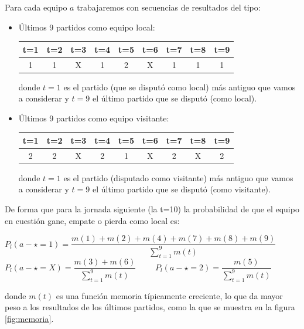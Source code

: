 Para cada equipo $a$ trabajaremos con secuencias de resultados del tipo:
\begin{itemize}
\item Últimos 9 partidos como equipo local:
\begin{center}
	\begin{tabular}{|c|c|c|c|c|c|c|c|c|}
		\hline  t=1 & t=2 & t=3 & t=4 & t=5 & t=6 & t=7 & t=8 & t=9 \\ 
		\hline  1 & 1 & X & 1 & 2 & X & 1 & 1 & 1 \\
		\hline
	\end{tabular} 
\end{center}
donde $t=1$ es el partido (que se disputó como local) más antiguo que vamos a considerar y $t=9$ el último partido que se disputó (como local).
\item Últimos 9 partidos como equipo visitante:
\begin{center}
	\begin{tabular}{|c|c|c|c|c|c|c|c|c|}
		\hline  t=1 & t=2 & t=3 & t=4 & t=5 & t=6 & t=7 & t=8 & t=9 \\ 
		\hline  2 & 2 & X & 2 & 1 & X & 2 & X & 2 \\ 
		\hline
	\end{tabular} 
\end{center}
donde $t=1$ es el partido (disputado como visitante) más antiguo que vamos a considerar y $t=9$ el último partido que se disputó (como visitante).
\end{itemize}

De forma que para la jornada siguiente (la t=10) la probabilidad de que el equipo en cuestión gane, empate o pierda como local es:
\begin{center}
	$P_{l}(a - \star=1)=\dfrac{m(1)+m(2)+m(4)+m(7)+m(8)+m(9)}{\sum_{t=1}^{9}m(t)}$\\
	$P_{l}(a - \star=X)=\dfrac{m(3)+m(6)}{\sum_{t=1}^{9}m(t)}$ \ \ \ \
	$P_{l}(a - \star=2)=\dfrac{m(5)}{\sum_{t=1}^{9}m(t)}$
\end{center}
donde $m(t)$ es una función memoria típicamente creciente, lo que da mayor peso a los resultados de los últimos partidos, como la que se muestra en la figura \ref{fig:memoria}.


